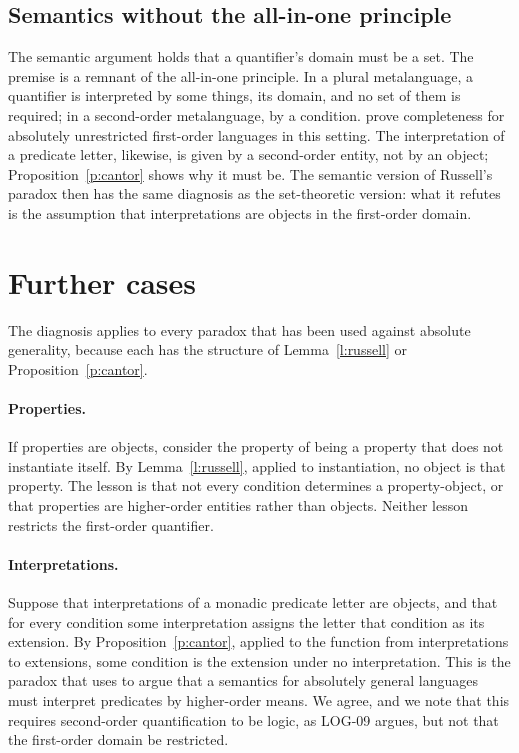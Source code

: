 \documentclass{situationist-preprint}
\begin{document}
\subsection{Semantics without the all-in-one principle}

The semantic argument holds that a quantifier's domain must be a set. The premise is a remnant of the all-in-one principle. In a plural metalanguage, a quantifier is interpreted by some things, its domain, and no set of them is required; in a second-order metalanguage, by a condition. \citet{RayoWilliamson2003} prove completeness for absolutely unrestricted first-order languages in this setting. The interpretation of a predicate letter, likewise, is given by a second-order entity, not by an object; Proposition~\ref{p:cantor} shows why it must be. The semantic version of Russell's paradox then has the same diagnosis as the set-theoretic version: what it refutes is the assumption that interpretations are objects in the first-order domain.

\section{Further cases}\label{s:variants}

The diagnosis applies to every paradox that has been used against absolute generality, because each has the structure of Lemma~\ref{l:russell} or Proposition~\ref{p:cantor}.

\paragraph{Properties.} If properties are objects, consider the property of being a property that does not instantiate itself. By Lemma~\ref{l:russell}, applied to instantiation, no object is that property. The lesson is that not every condition determines a property-object, or that properties are higher-order entities rather than objects. Neither lesson restricts the first-order quantifier.

\paragraph{Interpretations.} Suppose that interpretations of a monadic predicate letter are objects, and that for every condition some interpretation assigns the letter that condition as its extension. By Proposition~\ref{p:cantor}, applied to the function from interpretations to extensions, some condition is the extension under no interpretation. This is the paradox that \citet{Williamson2003} uses to argue that a semantics for absolutely general languages must interpret predicates by higher-order means. We agree, and we note that this requires second-order quantification to be logic, as LOG-09 argues, but not that the first-order domain be restricted.
\end{document}
